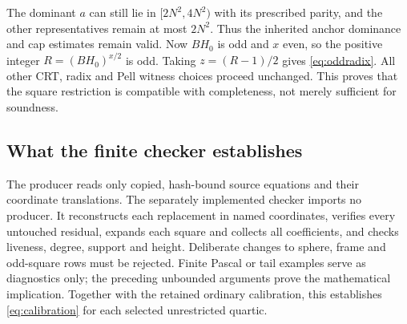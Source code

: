 The dominant $a$ can still lie in $[2N^2,4N^2)$ with its prescribed parity,
and the other representatives remain at most $2N^2$. Thus the inherited
anchor dominance and cap estimates remain valid. Now $BH_0$ is odd and
$x$ even, so the positive integer $R=(BH_0)^{x/2}$ is odd. Taking
$z=(R-1)/2$ gives \eqref{eq:oddradix}. All other CRT, radix and Pell
witness choices proceed unchanged. This proves that the square restriction
is compatible with completeness, not merely sufficient for soundness.

\subsection{What the finite checker establishes}
The producer reads only copied, hash-bound source equations and their
coordinate translations. The separately implemented checker imports no
producer. It reconstructs each replacement in named coordinates, verifies
every untouched residual, expands each square and collects all coefficients,
and checks liveness, degree, support and height. Deliberate changes to sphere,
frame and odd-square rows must be rejected. Finite Pascal or tail examples
serve as diagnostics only; the preceding unbounded arguments prove the
mathematical implication. Together with the retained ordinary calibration,
this establishes \eqref{eq:calibration} for each selected unrestricted
quartic.
